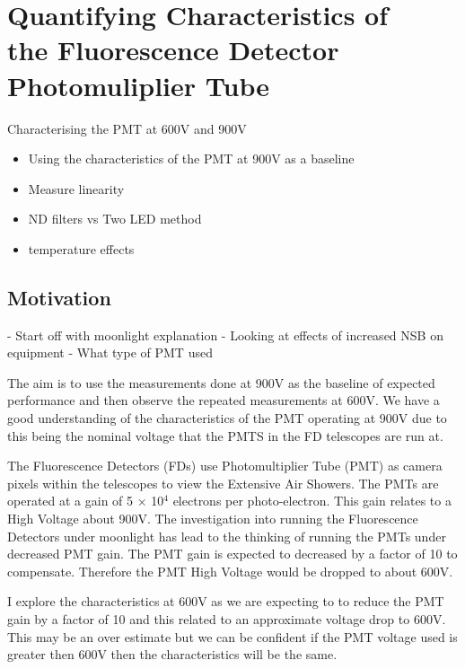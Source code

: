 \chapter[Quantifying Characteristics of the FD PMT]{\centering Quantifying Characteristics of \\ the Fluorescence Detector \\ Photomuliplier Tube \\}\label{Ch:PMTCharacter}

Characterising the PMT at 600V and 900V
\begin{itemize}
\item Using the characteristics of the PMT at 900V as a baseline
\item Measure linearity
\item ND filters vs Two LED method
\item temperature effects
\end{itemize}

\section{Motivation}

- Start off with moonlight explanation
- Looking at effects of increased NSB on equipment
- What type of PMT used

The aim is to use the measurements done at 900V as the baseline of expected performance and then observe the repeated measurements at 600V. We have a good  understanding of the characteristics of the PMT operating at 900V due to this being the nominal voltage that the PMTS in the FD telescopes are run at.

The Fluorescence Detectors (FDs) use Photomultiplier Tube (PMT) as camera pixels within the telescopes to view the Extensive Air Showers. The PMTs are operated at a gain of 5 $\times$ 10$^4$ electrons per photo-electron. This gain relates to a High Voltage about 900V. The investigation into running the Fluorescence Detectors under moonlight has lead to the thinking of running the PMTs under decreased PMT gain. The PMT gain is expected to decreased by a factor of 10 to compensate. Therefore the PMT High Voltage would be dropped to about 600V.

I explore the characteristics at 600V as we are expecting to to reduce the PMT gain by a factor of 10 and this related to an approximate voltage drop to 600V. This may be an over estimate but we can be confident if the PMT voltage used is greater then 600V then the characteristics will be the same.


